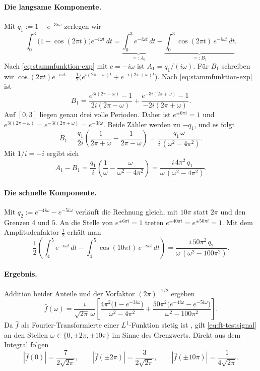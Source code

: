 \documentclass[a4paper,11pt,bibliography=totoc,listof=totoc,headinclude=true,cleardoublepage=empty,oneside]{scrbook}
\theoremstyle{plain}
\theoremstyle{definition}
\begin{document}
\paragraph{Die langsame Komponente.}
Mit $q_1:=1-e^{-3i\omega}$ zerlegen wir
\[
  \int_0^3\bigl(1-\cos(2\pi t)\bigr)e^{-i\omega t}\,dt
  =\underbrace{\int_0^3 e^{-i\omega t}\,dt}_{=:A_1}
   -\underbrace{\int_0^3 \cos(2\pi t)\,e^{-i\omega t}\,dt}_{=:B_1}.
\]
Nach \eqref{eq:stammfunktion-exp} mit $c=-i\omega$ ist $A_1 = q_1/(i\omega)$.
Für $B_1$ schreiben wir
$\cos(2\pi t)e^{-i\omega t}=\tfrac12\bigl(e^{i(2\pi-\omega)t}+e^{-i(2\pi+\omega)t}\bigr)$.
Nach \eqref{eq:stammfunktion-exp} ist
\[
  B_1=\frac{e^{3i(2\pi-\omega)}-1}{2i(2\pi-\omega)}
     +\frac{e^{-3i(2\pi+\omega)}-1}{-2i(2\pi+\omega)}.
\]
Auf $[0,3]$ liegen genau drei volle Perioden. Daher ist $e^{\pm 6\pi i}=1$ und
$e^{3i(2\pi-\omega)}=e^{-3i(2\pi+\omega)}=e^{-3i\omega}$. Beide Zähler werden
zu $-q_1$, und es folgt
\[
  B_1=\frac{q_1}{2i}\left(\frac{1}{2\pi+\omega}-\frac{1}{2\pi-\omega}\right)
     =\frac{q_1\,\omega}{i\,(\omega^2-4\pi^2)} .
\]
Mit $1/i=-i$ ergibt sich
\[
  A_1-B_1
  =\frac{q_1}{i}\left(\frac1\omega-\frac{\omega}{\omega^2-4\pi^2}\right)
  =\frac{i\,4\pi^2\,q_1}{\omega\,(\omega^2-4\pi^2)} .
\]
 
\paragraph{Die schnelle Komponente.}
Mit $q_2:=e^{-4i\omega}-e^{-5i\omega}$ verläuft die Rechnung gleich, mit
$10\pi$ statt $2\pi$ und den Grenzen $4$ und $5$. An die Stelle von
$e^{\pm6\pi i}=1$ treten $e^{\pm40\pi i}=e^{\pm50\pi i}=1$. Mit dem
Amplitudenfaktor $\tfrac12$ erhält man
\[
  \frac12\left(\int_4^5 e^{-i\omega t}\,dt - \int_4^5 \cos(10\pi t)\,e^{-i\omega t}\,dt\right)
  =\frac{i\,50\pi^2\,q_2}{\omega\,(\omega^2-100\pi^2)} .
\]
 
\paragraph{Ergebnis.}
Addition beider Anteile und der Vorfaktor $(2\pi)^{-1/2}$ ergeben
\begin{equation}\label{eq:ft-testsignal}
  \hat f(\omega)
  =\frac{i}{\sqrt{2\pi}\,\omega}
   \left[
     \frac{4\pi^{2}\bigl(1-e^{-3i\omega}\bigr)}{\omega^{2}-4\pi^{2}}
     +\frac{50\pi^{2}\bigl(e^{-4i\omega}-e^{-5i\omega}\bigr)}{\omega^{2}-100\pi^{2}}
   \right].
\end{equation}
Da $\hat f$ als Fourier-Transformierte einer $L^1$-Funktion stetig ist
\cite[Satz~12.1]{serov}, gilt \eqref{eq:ft-testsignal} an den Stellen
$\omega\in\{0,\pm2\pi,\pm10\pi\}$ im Sinne des Grenzwerts. Direkt aus dem
Integral folgen
\[
  |\hat f(0)|=\frac{7}{2\sqrt{2\pi}},\qquad
  |\hat f(\pm2\pi)|=\frac{3}{2\sqrt{2\pi}},\qquad
  |\hat f(\pm10\pi)|=\frac{1}{4\sqrt{2\pi}} .
\] 
 
\end{document}

